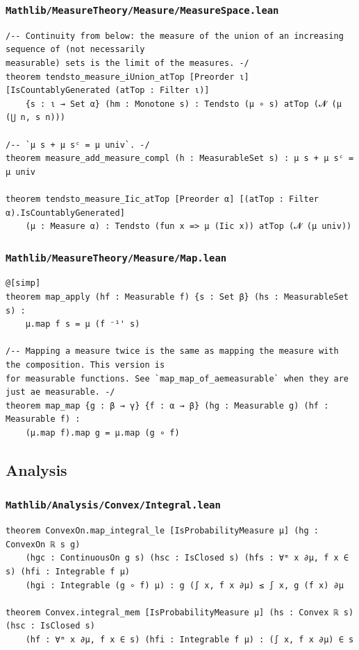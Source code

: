 \subsubsection{\texttt{Mathlib/MeasureTheory/Measure/MeasureSpace.lean}}
\begin{lstlisting}[language=lean]
/-- Continuity from below: the measure of the union of an increasing sequence of (not necessarily
measurable) sets is the limit of the measures. -/
theorem tendsto_measure_iUnion_atTop [Preorder ι] [IsCountablyGenerated (atTop : Filter ι)]
    {s : ι → Set α} (hm : Monotone s) : Tendsto (μ ∘ s) atTop (𝓝 (μ (⋃ n, s n)))

/-- `μ s + μ sᶜ = μ univ`. -/
theorem measure_add_measure_compl (h : MeasurableSet s) : μ s + μ sᶜ = μ univ

theorem tendsto_measure_Iic_atTop [Preorder α] [(atTop : Filter α).IsCountablyGenerated]
    (μ : Measure α) : Tendsto (fun x => μ (Iic x)) atTop (𝓝 (μ univ))
\end{lstlisting}
\newpage
\subsubsection{\texttt{Mathlib/MeasureTheory/Measure/Map.lean}}
\begin{lstlisting}[language=lean]
@[simp]
theorem map_apply (hf : Measurable f) {s : Set β} (hs : MeasurableSet s) :
    μ.map f s = μ (f ⁻¹' s)

/-- Mapping a measure twice is the same as mapping the measure with the composition. This version is
for measurable functions. See `map_map_of_aemeasurable` when they are just ae measurable. -/
theorem map_map {g : β → γ} {f : α → β} (hg : Measurable g) (hf : Measurable f) :
    (μ.map f).map g = μ.map (g ∘ f)
\end{lstlisting}

\subsection{Analysis}

\subsubsection{\texttt{Mathlib/Analysis/Convex/Integral.lean}}
\begin{lstlisting}[language=lean]
theorem ConvexOn.map_integral_le [IsProbabilityMeasure μ] (hg : ConvexOn ℝ s g)
    (hgc : ContinuousOn g s) (hsc : IsClosed s) (hfs : ∀ᵐ x ∂μ, f x ∈ s) (hfi : Integrable f μ)
    (hgi : Integrable (g ∘ f) μ) : g (∫ x, f x ∂μ) ≤ ∫ x, g (f x) ∂μ

theorem Convex.integral_mem [IsProbabilityMeasure μ] (hs : Convex ℝ s) (hsc : IsClosed s)
    (hf : ∀ᵐ x ∂μ, f x ∈ s) (hfi : Integrable f μ) : (∫ x, f x ∂μ) ∈ s
\end{lstlisting}

